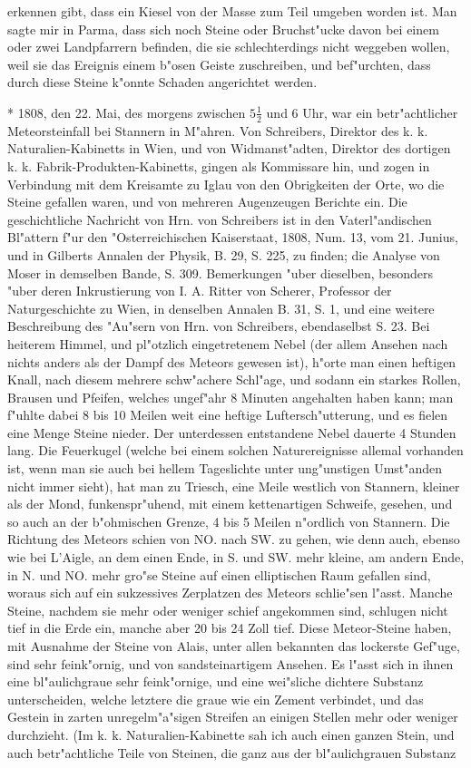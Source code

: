 \documentclass[a4paper, 11pt, oneside, polutonikogreek, german]{article}
\begin{document}
erkennen gibt, dass ein Kiesel von der Masse zum Teil umgeben worden ist. Man sagte mir in Parma, dass sich noch Steine oder Bruchst"ucke davon bei einem oder zwei Landpfarrern befinden, die sie schlechterdings nicht weggeben wollen, weil sie das Ereignis einem b"osen Geiste zuschreiben, und bef"urchten, dass durch diese Steine k"onnte Schaden angerichtet werden.

* 1808, den 22. Mai, des morgens zwischen $\mathfrak{5\frac{1}{2}}$ und 6 Uhr, war ein betr"achtlicher Meteorsteinfall bei Stannern in M"ahren. Von Schreibers, Direktor des k. k. Naturalien-Kabinetts in Wien, und von Widmanst"adten, Direktor des dortigen k. k. Fabrik-Produkten-Kabinetts, gingen als Kommissare hin, und zogen in Verbindung mit dem Kreisamte zu Iglau von den Obrigkeiten der Orte, wo die Steine gefallen waren, und von mehreren Augenzeugen Berichte ein. Die geschichtliche Nachricht von Hrn. von Schreibers ist in den Vaterl"andischen Bl"attern f"ur den "Osterreichischen Kaiserstaat, 1808, Num. 13, vom 21. Junius, und in Gilberts Annalen der Physik, B. 29, S. 225, zu finden; die Analyse von Moser in demselben Bande, S. 309. Bemerkungen "uber dieselben, besonders "uber deren Inkrustierung von I. A. Ritter von Scherer, Professor der Naturgeschichte zu Wien, in denselben Annalen B. 31, S. 1, und eine weitere Beschreibung des "Au"sern von Hrn. von Schreibers, ebendaselbst S. 23. Bei heiterem Himmel, und pl"otzlich eingetretenem Nebel (der allem Ansehen nach nichts anders als der Dampf des Meteors gewesen ist), h"orte man einen heftigen Knall, nach diesem mehrere schw"achere Schl"age, und sodann ein starkes Rollen, Brausen und Pfeifen, welches ungef"ahr 8 Minuten angehalten haben kann; man f"uhlte dabei 8 bis 10 Meilen weit eine heftige Luftersch"utterung, und es fielen eine Menge Steine nieder. Der unterdessen entstandene Nebel dauerte 4 Stunden lang. Die Feuerkugel (welche bei einem solchen Naturereignisse allemal vorhanden ist, wenn man sie auch bei hellem Tageslichte unter ung"unstigen Umst"anden nicht immer sieht), hat man zu Triesch, eine Meile westlich von Stannern, kleiner als der Mond, funkenspr"uhend, mit einem kettenartigen Schweife, gesehen, und so auch an der b"ohmischen Grenze, 4 bis 5 Meilen n"ordlich von Stannern. Die Richtung des Meteors schien von NO. nach SW. zu gehen, wie denn auch, ebenso wie bei L'Aigle, an dem einen Ende, in S. und SW. mehr kleine, am andern Ende, in N. und NO. mehr gro"se Steine auf einen elliptischen Raum gefallen sind, woraus sich auf ein sukzessives Zerplatzen des Meteors schlie"sen l"asst. Manche Steine, nachdem sie mehr oder weniger schief angekommen sind, schlugen nicht tief in die Erde ein, manche aber 20 bis 24 Zoll tief. Diese Meteor-Steine haben, mit Ausnahme der Steine von Alais, unter allen bekannten das lockerste Gef"uge, sind sehr feink"ornig, und von sandsteinartigem Ansehen. Es l"asst sich in ihnen eine bl"aulichgraue sehr feink"ornige, und eine wei"sliche dichtere Substanz unterscheiden, welche letztere die graue wie ein Zement verbindet, und das Gestein in zarten unregelm"a"sigen Streifen an einigen Stellen mehr oder weniger durchzieht. (Im k. k. Naturalien-Kabinette sah ich auch einen ganzen Stein, und auch betr"achtliche Teile von Steinen, die ganz aus der bl"aulichgrauen Substanz 
\end{document}
